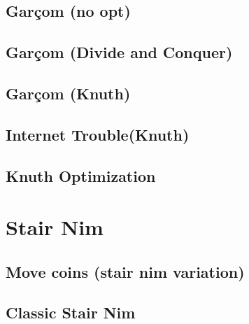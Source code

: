 \subsection{Garçom (no opt)}
\raggedbottom
\hrulefill
\subsection{Garçom (Divide and Conquer)}
\raggedbottom
\hrulefill
\subsection{Garçom (Knuth)}
\raggedbottom
\hrulefill
\subsection{Internet Trouble(Knuth)}
\raggedbottom
\hrulefill
\subsection{Knuth Optimization}
\raggedbottom
\hrulefill

\section{Stair Nim}
\subsection{Move coins (stair nim variation)}
\raggedbottom
\hrulefill
\subsection{Classic Stair Nim}
\raggedbottom
\hrulefill

